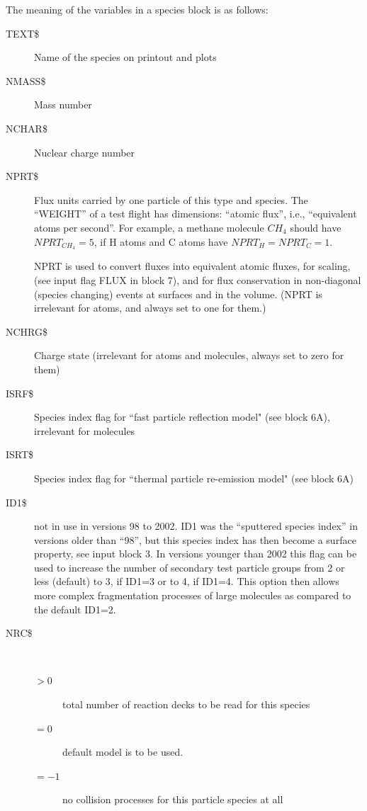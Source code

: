 The meaning of the variables in a species block is as follows:
\begin{description}
  \item[TEXT\$] Name of the species on printout and plots
  \item[NMASS\$] Mass
        number
  \item[NCHAR\$] Nuclear charge number
  \item[NPRT\$] Flux units carried by
        one particle of this type and species.
        The ``WEIGHT'' of a test flight has dimensions: ``atomic flux'', i.e.,
        ``equivalent atoms per second''.
        For example, a methane molecule $CH_4$ should have $NPRT_{CH_4} = 5$, if H
        atoms and C atoms have $NPRT_H = NPRT_C = 1$.

        NPRT is used to convert fluxes into equivalent atomic fluxes, for scaling, (see
        input flag FLUX in block 7), and for flux conservation in non-diagonal (species
        changing) events at surfaces and in the volume.
        (NPRT is irrelevant for atoms, and always set to one for them.)
  \item[NCHRG\$] Charge state (irrelevant for atoms and molecules, always set to
        zero for them)
  \item[ISRF\$] Species index flag for ``fast particle reflection
        model" (see block 6A), irrelevant for molecules
  \item[ISRT\$] Species index
        flag for ``thermal particle re-emission model" (see block 6A)
  \item[ID1\$] not
        in use in versions 98 to 2002.
        ID1 was the  ``sputtered species index'' in versions older than ``98'', but
        this species index has then become a surface property, see input block 3.
        In versions younger than 2002 this flag can be used to increase the number of
        secondary test particle groups from 2 or less (default) to 3, if ID1=3 or to 4,
        if ID1=4.
        This option then allows more complex fragmentation processes of large molecules
        as compared to the default ID1=2.
  \item[NRC\$] ~
        \begin{description}
          \item[$> 0$] total number of reaction decks
                to be read for this species
          \item[$= 0$] default model is to be used.
          \item[$= -1$] no collision processes for this particle species at all

\end{description}
\end{description}
